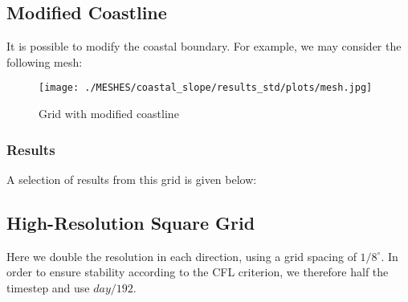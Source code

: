 \documentclass[10pt]{article}
\begin{document}
\iffalse
\allplot{simple}{box}{1}{1948}{12}{1956}{0}{10}{22}
\fi

\subsection{Modified Coastline}

It is possible to modify the coastal boundary. For example, we may consider the following mesh:


\begin{figure}[H]
\centering
  \texttt{[image: ./MESHES/coastal\_slope/results\_std/plots/mesh.jpg]}
  \caption{\footnotesize Grid with modified coastline}
  \label{fig:mesh_coastal_slope}
\end{figure}

\subsubsection{Results}

A selection of results from this grid is given below:
\iffalse
\allplot{coastal}{slope}{1}{1948}{12}{1956}{0}{10}{22}
\fi
\subsection{High-Resolution Square Grid}
Here we double the resolution in each direction, using a grid spacing of $1/8^\circ$. In order to ensure stability according to the CFL criterion, we therefore half the timestep and use $day/192$. 

\end{document}
